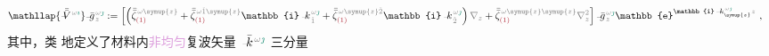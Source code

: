 \begin{subequations}
\begin{align}
	&\mathllap{ \xint{\mathcolor{gray}{-}}{25}{\bar{\bar{V}}}^{\;\! \mathcolor{gray}{\omega} \textcolor{PineGreen}{\imath}} } \xint{{}^{}_{\mathcolor{gray}{-}}}{10}{\bar{g}}^{\;\!\mathcolor{gray}{\omega} \textcolor{PineGreen}{\jmath}}_{\;\! \mathcolor{gray}{z}}:= \left[ \left( \bar{\bar{\zeta}}^{\;\! \mathcolor{gray}{\omega} \mathcolor{gray}{\symup{z}}}_{\textcolor{Maroon}{(1)}} + \bar{\bar{\zeta}}^{\;\! \mathcolor{gray}{\omega} \mathcolor{gray}{\check{1} \symup{z}}}_{\textcolor{Maroon}{(1)}} \mathbb{i} \xint{\begin{smallmatrix} ~ \\ {}^{}_{\mathcolor{gray}{-}} \\ ~ \end{smallmatrix}}{15}{k}_{\;\! \mathcolor{gray}{\check{1}}}^{\;\! \mathcolor{gray}{\omega} \textcolor{PineGreen}{\jmath}} + \bar{\bar{\zeta}}^{\;\! \mathcolor{gray}{\omega} \mathcolor{gray}{\symup{z} \check{2}}}_{\textcolor{Maroon}{(1)}} \mathbb{i} \xint{\begin{smallmatrix} ~ \\ {}^{}_{\mathcolor{gray}{-}} \\ ~ \end{smallmatrix}}{15}{k}_{\;\! \mathcolor{gray}{\check{2}}}^{\;\! \mathcolor{gray}{\omega} \textcolor{PineGreen}{\jmath}} \right) \mathcolor{gray}{\nabla_z} + \bar{\bar{\zeta}}^{\;\! \mathcolor{gray}{\omega} \mathcolor{gray}{\symup{z} \symup{z}}}_{\textcolor{Maroon}{(1)}} \mathcolor{gray}{\nabla_z^2} \right] \xint{{}^{}_{\mathcolor{gray}{-}}}{10}{\bar{g}}^{\;\!\mathcolor{gray}{\omega} \textcolor{PineGreen}{\jmath}}_{\;\! \mathcolor{gray}{z}} \mathbb{e}^{\mathbb{i} \xint{\begin{smallmatrix} ~ \\ {}^{}_{\mathcolor{gray}{-}} \\ ~ \end{smallmatrix}}{15}{k}_{\symup{z}}^{\;\! \mathcolor{gray}{\omega} \textcolor{PineGreen}{\jmath}} \mathcolor{gray}{z}} ~, \label{eq:plane_wave_basis_eq-left_V}
\end{align}
\end{subequations}
其中，类  地定义了材料内\textcolor{Plum}{非均匀}\cite{wangComplexRayTracing2008a,changRayTracingAbsorbing2005,sturmElectromagneticWavesCrystals2024}复\textcolor{PineGreen}{波矢}量 $\xint{\begin{smallmatrix} ~ \\ {}^{}_{\mathcolor{gray}{-}} \\ ~ \end{smallmatrix}}{15}{\bar{k}}^{\;\! \mathcolor{gray}{\omega} \textcolor{PineGreen}{\jmath}}$ 三分量\cite{xieAnalytic3DVector}
